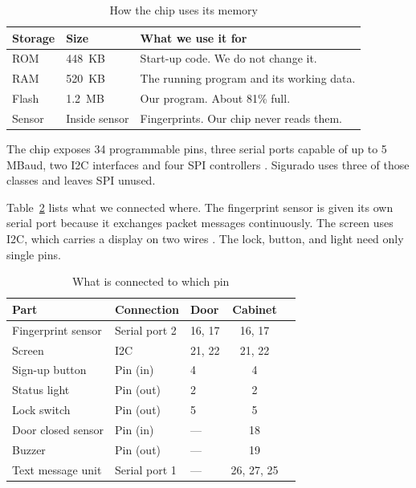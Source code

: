 \begin{table}[H]
\centering
\caption{How the chip uses its memory}
\label{tab:memory}
\begin{tabular}{@{}llp{58mm}@{}}
\toprule
Storage & Size & What we use it for \\
\midrule
ROM    & 448~KB & Start-up code. We do not change it. \\
RAM    & 520~KB & The running program and its working data. \\
Flash  & 1.2~MB & Our program. About 81\% full. \\
Sensor & Inside sensor & Fingerprints. Our chip never reads them. \\
\bottomrule
\end{tabular}
\end{table}


The chip exposes 34 programmable pins, three serial ports capable of up to
5 MBaud, two I2C interfaces and four SPI controllers \parencite{espressif2025}.
Sigurado uses three of those classes and leaves SPI unused.

Table~\ref{tab:io} lists what we connected where. The fingerprint sensor is
given its own serial port because it exchanges packet messages continuously. The
screen uses I2C, which carries a display on two wires
\parencite{espressif2025}. The lock, button, and light need only single pins.

\begin{table}[H]
\centering
\caption{What is connected to which pin}
\label{tab:io}
\begin{tabular}{@{}lllc c@{}}
\toprule
Part & Connection & Door & Cabinet \\
\midrule
Fingerprint sensor & Serial port 2 & 16, 17 & 16, 17 \\
Screen             & I2C           & 21, 22 & 21, 22 \\
Sign-up button     & Pin (in)      & 4      & 4 \\
Status light       & Pin (out)     & 2      & 2 \\
Lock switch        & Pin (out)     & 5      & 5 \\
Door closed sensor & Pin (in)      & ---    & 18 \\
Buzzer             & Pin (out)     & ---    & 19 \\
Text message unit  & Serial port 1 & ---    & 26, 27, 25 \\
\bottomrule
\end{tabular}
\end{table}

